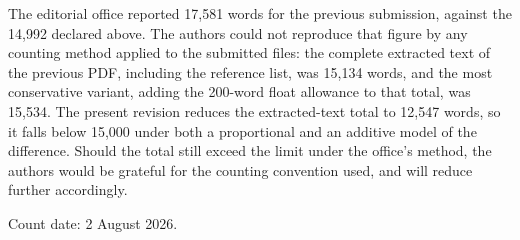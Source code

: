 \documentclass[11pt,a4paper]{article}
\begin{document}
The editorial office reported 17,581 words for the previous submission, against the 14,992 declared above. The authors could not reproduce that figure by any counting method applied to the submitted files: the complete extracted text of the previous PDF, including the reference list, was 15,134 words, and the most conservative variant, adding the 200-word float allowance to that total, was 15,534. The present revision reduces the extracted-text total to 12,547 words, so it falls below 15,000 under both a proportional and an additive model of the difference. Should the total still exceed the limit under the office's method, the authors would be grateful for the counting convention used, and will reduce further accordingly.

Count date: 2 August 2026.
\end{document}
